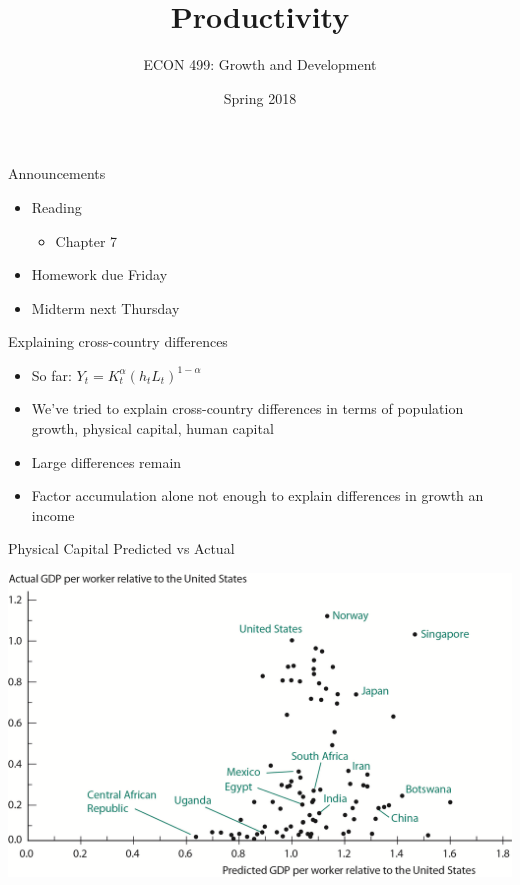 \documentclass[10pt]{beamer}
\author{ECON 499: Growth and Development}
\date{Spring 2018}
\title{Productivity}
\begin{document}
\maketitle

\begin{frame}[label={sec:org2cda533}]{}
\alert{Announcements}
\begin{itemize}
\item Reading
\begin{itemize}
\item Chapter 7
\end{itemize}
\item Homework due Friday
\item Midterm next Thursday
\end{itemize}
\end{frame}

\begin{frame}[label={sec:org04ea2af}]{}
\alert{Explaining cross-country differences}
\begin{itemize}
\item So far: \(Y_t = K_t^\alpha (h_tL_t)^{1-\alpha}\)
\item We've tried to explain cross-country differences in terms of population growth, physical capital, human capital
\item Large differences remain
\item Factor accumulation alone not enough to explain differences in growth an income
\end{itemize}
\end{frame}

\begin{frame}[label={sec:org74d3219}]{Physical Capital Predicted vs Actual}
\begin{center}
\includegraphics[width=.75\textwidth]{./img/3.7.png}
\end{center}
\end{frame}
\end{document}
